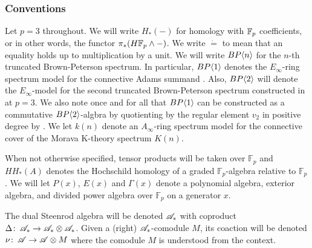 \subsubsection*{Conventions}
Let $p=3$ throughout. We will write $H_*(-)$ for homology with $\mathbb{F}_p$ coefficients, or in other words, the functor $\pi_*(H\mathbb{F}_p\wedge -)$. We write $\dot{=}$ to mean that an equality holds up to multiplication by a unit. We will write $BP\langle n \rangle$ for the $n$-th truncated Brown-Peterson spectrum. In particular, $BP\langle 1 \rangle$ denotes the $E_{\infty}$-ring spectrum model for the connective Adams summand \cite{McClureStaffeldt}. Also, $BP\langle 2 \rangle$ will denote the $E_{\infty}$-model for the second truncated Brown-Peterson spectrum constructed in \cite{HillLawson} at $p=3$. We also note once and for all that $BP\langle 1 \rangle$ can be constructed as a commutative $BP\langle 2 \rangle$-algbra by quotienting by the regular element $v_2$ in positive degree by \cite{EKMM}. 
We let $k(n)$ denote an $A_{\infty}$-ring spectrum model for the connective cover of the Morava K-theory spectrum $K(n)$. 

When not otherwise specified, tensor products will be taken over $\mathbb{F}_p$ and $HH_*(A)$ denotes the Hochschild homology of a graded $\mathbb{F}_p$-algebra relative to $\mathbb{F}_p$. We will let $P(x)$, $E(x)$ and $\Gamma(x)$ denote a polynomial algebra, exterior algebra, and divided power algebra over $\mathbb{F}_p$ on a generator $x$. 

The dual Steenrod algebra will be denoted $\mathscr{A}_*$ with coproduct $\Delta\colon \thinspace \mathscr{A}_*\to \mathscr{A}_*\otimes \mathscr{A}_*$. Given a (right) $\mathscr{A}_*$-comodule $M$, its coaction will be denoted $\nu\colon \thinspace \mathscr{A}\to \mathscr{A}\otimes M$ where the comodule $M$ is understood from the context. 